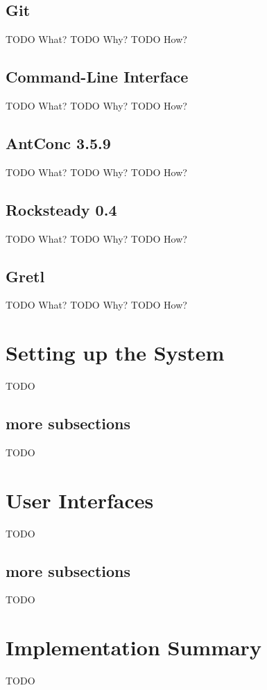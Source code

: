 \subsection{Git}

TODO What?
TODO Why?
TODO How?

\subsection{Command-Line Interface}

TODO What?
TODO Why?
TODO How?

\subsection{AntConc 3.5.9}

TODO What?
TODO Why?
TODO How?

\subsection{Rocksteady 0.4}

TODO What?
TODO Why?
TODO How?

\subsection{Gretl}

TODO What?
TODO Why?
TODO How?

\section{Setting up the System}
TODO
\subsection{more subsections}
TODO
\section{User Interfaces}
TODO
\subsection{more subsections}
TODO
\section{Implementation Summary}
TODO